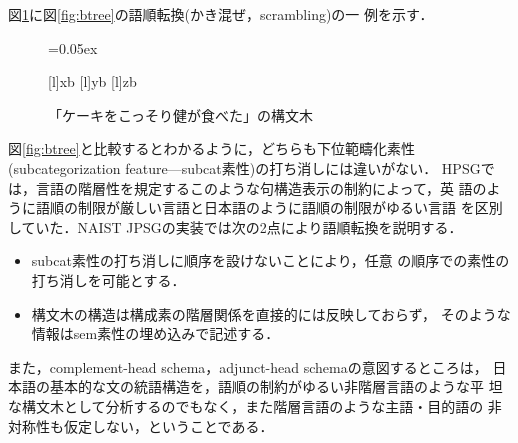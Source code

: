 図\ref{fig:stree}に図\ref{fig:btree}の語順転換(かき混ぜ，scrambling)の一
例を示す．
\begin{figure}
\begin{center}
 \unitlength=0.05ex
 \hspace*{5cm}
\end{center}
[l]{xb}
[l]{yb}
[l]{zb}
\caption{「ケーキをこっそり健が食べた」の構文木}\label{fig:stree}
\end{figure}
図\ref{fig:btree}と比較するとわかるように，どちらも下位範疇化素性
(subcategorization feature---{\sc subcat}素性)の打ち消しには違いがない．
HPSGでは，言語の階層性を規定するこのような句構造表示の制約によって，英
語のように語順の制限が厳しい言語と日本語のように語順の制限がゆるい言語
を区別していた．NAIST JPSGの実装では次の2点により語順転換を説明する．
\begin{itemize}
\item [1.] {\sc subcat}素性の打ち消しに順序を設けないことにより，任意
の順序での素性の打ち消しを可能とする．
\item [2.] 構文木の構造は構成素の階層関係を直接的には反映しておらず，
そのような情報は{\sc sem}素性の埋め込みで記述する．
\end{itemize}
また，complement-head schema，adjunct-head schemaの意図するところは，
日本語の基本的な文の統語構造を，語順の制約がゆるい非階層言語のような平
坦な構文木として分析するのでもなく，また階層言語のような主語・目的語の
非対称性も仮定しない，ということである．

